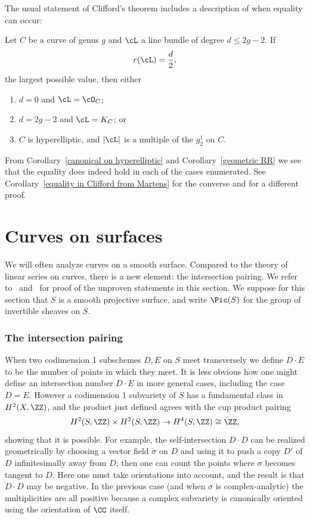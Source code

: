 The usual statement of Clifford's theorem includes a description of when equality can occur:

\begin{theorem}\label{Clifford}\label{Clifford equality}
Let $C$ be a curve of genus $g$ and $\cL$ a line bundle of degree $d \leq 2g-2$. If
$$
r(\cL) = \frac{d}{2},
$$
the largest possible value, then either
\begin{enumerate}
\item $d=0$ and $\cL = \cO_C$;
\item $d = 2g-2$ and $\cL = K_C$; or
\item $C$ is hyperelliptic, and $|\cL|$ is a multiple of the $g^1_2$ on $C$.
\end{enumerate}
\end{theorem}

From Corollary~\ref{canonical on hyperelliptic} and Corollary~\ref{geometric RR} we see that the equality does indeed hold
in each of the cases enumerated. See
Corollary~\ref{equality in Clifford from Martens} for the converse and \cite[IV.5.4]{Hartshorne1977}
for a different proof.

 \section{Curves on surfaces}\label{surface basics}
 
 We will often analyze curves  on a smooth surface. Compared to the theory of linear series on curves, there is a new element: the intersection pairing. We refer to~\cite[Chapter V]{Hartshorne1977}
 and~\cite[Chapter I]{Beauville} for proof of the unproven statements in this section.
 We suppose for this section that $S$ is a smooth projective surface,
 and write $\Pic(S)$ for the group of invertible sheaves on $S$.

\subsubsection{The intersection pairing}

When two codimension 1 subschemes $D,E$ on $S$ meet transversely we define $D\cdot E$ to be the number of points in which they meet.  
It is less obvious how one might define an intersection number $D\cdot E$ in more general cases,
including the case $D=E$. However 
a codimension 1 subvariety of $S$ has a fundamental class in $H^{2}(X,\ZZ)$, and the product just defined
agrees with the cup product pairing 
$$
H^{2}(S,\ZZ) \times H^{2}(S,\ZZ) \to H^4(S,\ZZ)\cong \ZZ,
$$
showing that it is possible. For example, the self-intersection $D\cdot D$ can be realized geometrically
 by choosing a  vector field $\sigma$ on $D$ and using it to push a copy $D'$ of $D$ infinitesimally away from $D$; then
 one can count the points where $\sigma$ becomes tangent to $D$. Here one must take orientations into account,
 and the result is that $D\cdot D$ may be negative. In the previous case (and when $\sigma$ is complex-analytic)
 the multiplicities are all positive because a complex subvariety is canonically oriented using the orientation of $\CC$
 itself.

